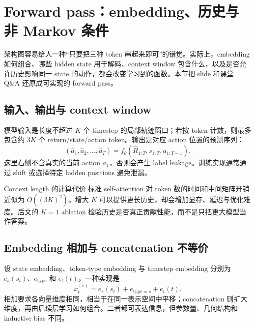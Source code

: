 \section{Forward pass：embedding、历史与非 Markov 条件}

架构图容易给人一种“只要把三种 token 串起来即可”的错觉。实际上，embedding 如何组合、哪些 hidden state 用于解码、context window 包含什么，以及是否允许历史影响同一 state 的动作，都会改变学习到的函数。本节把 slide 和课堂 Q\&A 还原成可实现的 forward pass。

\subsection{输入、输出与 context window}

模型输入是长度不超过 $K$ 个 timestep 的局部轨迹窗口；若按 token 计数，则最多包含约 $3K$ 个 return/state/action token。输出是对应 action 位置的预测序列：
\[
(\widehat{a}_1,\widehat{a}_2,\ldots,\widehat{a}_T)
=f_{\theta}(\widehat{R}_{1:T},s_{1:T},a_{1:T-1}).
\]
这里右侧不含真实的当前 action $a_T$，否则会产生 label leakage。训练实现通常通过 shift 或选择特定 hidden positions 避免泄漏。


\begin{importantbox}{Context length 的计算代价}
标准 self-attention 对 token 数的时间和中间矩阵开销近似为 $O((3K)^2)$。增大 $K$ 可以提供更长历史，却会增加显存、延迟与优化难度。后文的 $K=1$ ablation 检验历史是否真正贡献性能，而不是只把更大模型当作答案。
\end{importantbox}

\subsection{Embedding 相加与 concatenation 不等价}

设 state embedding、token-type embedding 与 timestep embedding 分别为 $e_s(s_t)$、$e_{\mathrm{type}}$ 和 $e_t(t)$，一种实现是
\[
x_t^{(s)}=e_s(s_t)+e_{\mathrm{type}=s}+e_t(t).
\]
相加要求各向量维度相同，相当于在同一表示空间中平移；concatenation 则扩大维度，再由后续层学习如何组合。二者都可表达信息，但参数量、几何结构和 inductive bias 不同。


